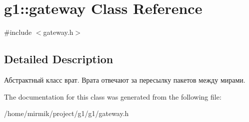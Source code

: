 \hypertarget{classg1_1_1gateway}{}\section{g1\+:\+:gateway Class Reference}
\label{classg1_1_1gateway}


{\ttfamily \#include $<$gateway.\+h$>$}



\subsection{Detailed Description}
Абстрактный класс врат. Врата отвечают за пересылку пакетов между мирами. 

The documentation for this class was generated from the following file\+:\begin{DoxyCompactItemize}
\item 
/home/mirmik/project/g1/g1/gateway.\+h\end{DoxyCompactItemize}
